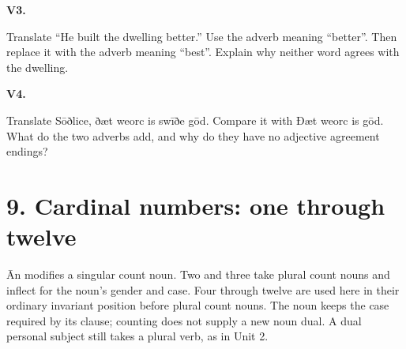 \par\begin{minipage}{\linewidth}\raggedright
\textbf{V3.}

Translate “He built the dwelling better.” Use the adverb meaning “better”. Then replace it with the adverb meaning “best”. Explain why neither word agrees with the dwelling.

\end{minipage}\par\addvspace{4pt}

\par\begin{minipage}{\linewidth}\raggedright
\textbf{V4.}

Translate Sōðlice, ðæt weorc is swīðe gōd. Compare it with Ðæt weorc is gōd. What do the two adverbs add, and why do they have no adjective agreement endings?

\end{minipage}\par\addvspace{4pt}

\section*{9. Cardinal numbers: one through twelve}

Ān modifies a singular count noun. Two and three take plural count nouns and inflect for the noun’s gender and case. Four through twelve are used here in their ordinary invariant position before plural count nouns. The noun keeps the case required by its clause; counting does not supply a new noun dual. A dual personal subject still takes a plural verb, as in Unit 2.


